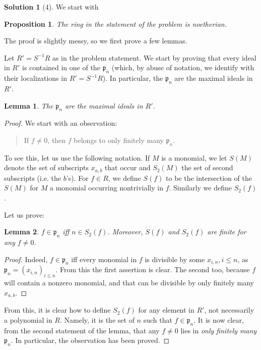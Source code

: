 \documentclass{article}
\newtheorem{proposition}{Proposition}
\newtheorem{lemma}{Lemma}
\theoremstyle{definition}
\newtheorem*{solution}{Solution}
\begin{document}
\begin{solution}[4] 

We start with
\begin{proposition} 
The ring in the statement of the problem is noetherian.
\end{proposition} 

The proof is slightly messy, so we first prove a few lemmas.

Let $R' = S^{-1}R$ as in the problem statement. We start by proving that every ideal in $R'$ is contained
in one of the $\mathfrak{p}_n$ (which, by abuse of notation, we identify with
their localizations in $R' = S^{-1}R$). 
In particular, the $\mathfrak{p}_n$ are the maximal ideals in $R'$.

\begin{lemma} 
The $\mathfrak{p}_n$ are the maximal ideals in $R'$.
\end{lemma} 
\begin{proof} 
We start with an observation:
\begin{quote}
If $f \neq 0 $, then $f$ belongs to only finitely many $\mathfrak{p}_n$.
\end{quote}
To see this, let us use the following notation. If $M$ is a monomial, we let
$S(M)$ denote the set of subscripts $x_{a,b}$ that occur and $S_2(M)$ the set
of second subscripts (i.e. the $b$'s). 
For $f \in R$, we define $S(f)$ to be the intersection of the $S(M)$ for $M$ a
monomial occurring nontrivially in $f$. Similarly we define $S_2(f)$.

Let us prove:
\begin{lemma} 
$f \in \mathfrak{p}_n$ iff $n \in S_2(f)$. Moreover, $S(f)$ and $S_2(f)$ are
finite for any $f \neq 0$.
\end{lemma} 
\begin{proof} 
Indeed, $f \in \mathfrak{p}_n$ iff every monomial in $f$ is divisible by some
$x_{i,n}, i \leq n$, as $\mathfrak{p}_n  = (x_{i,n})_{i \leq n}$. From this the first assertion is clear. The second too,
because $f$ will contain a nonzero monomial, and that can be divisible by only
finitely many $x_{a,b}$.
\end{proof} 
From this, it is clear how to define $ S_2(f)$ for any element in $R'$,
not necessarily a polynomial in $R$. Namely, it is the set of $n$ such that $f
\in \mathfrak{p}_n$. 
It is now clear, from the second statement of the lemma, that any $f \neq 0$ lies in \emph{only finitely many
$\mathfrak{p}_n$}. In particular, the observation has been proved. 


\end{proof}
\end{solution}
\end{document}
